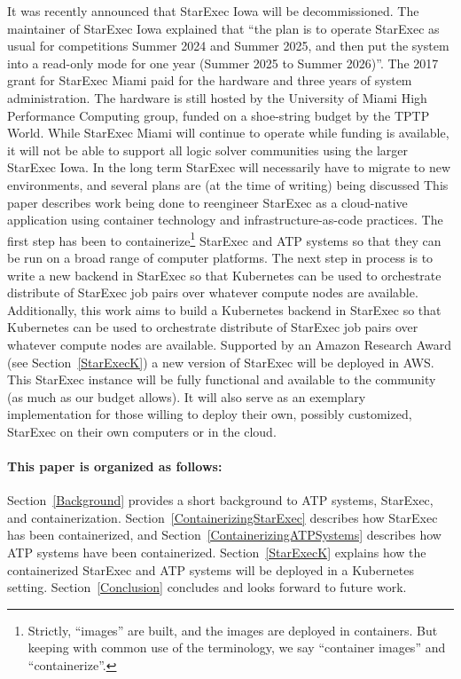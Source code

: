 \documentclass{easychair}
\begin{document}
It was recently announced that StarExec Iowa will be decommissioned. 
The maintainer of StarExec Iowa explained that ``the plan is to operate StarExec as usual for 
competitions Summer 2024 and Summer 2025, and then put the system into a read-only mode for one 
year (Summer 2025 to Summer 2026)''.
The 2017 grant for StarExec Miami paid for the hardware and three years of system administration.
The hardware is still hosted by the University of Miami High Performance Computing group,
funded on a shoe-string budget by the TPTP World.
While StarExec Miami will continue to operate while funding is available, it will not be able
to support all logic solver communities using the larger StarExec Iowa.
In the long term StarExec will necessarily have to migrate to new environments, and several plans 
are (at the time of writing) being discussed
This paper describes work being done to reengineer StarExec as a cloud-native application using
container technology and infrastructure-as-code practices.
The first step has been to containerize\footnote{%
Strictly, ``images'' are built, and the images are deployed in containers. 
But keeping with common use of the terminology, we say ``container images'' and ``containerize''.} 
StarExec and ATP systems so that they can be run on a broad range of computer platforms.
The next step in process is to write a new backend in StarExec so that Kubernetes can be used to
orchestrate distribute of StarExec job pairs over whatever compute nodes are available.
Additionally, this work aims to build a Kubernetes backend in StarExec so that Kubernetes can
be used to orchestrate distribute of StarExec job pairs over whatever compute nodes are available.
Supported by an Amazon Research Award (see Section~\ref{StarExecK}) a new version of StarExec
will be deployed in AWS.
This StarExec instance will be fully functional and available to the community (as much as our 
budget allows). 
It will also serve as an exemplary implementation for those willing to deploy their own, possibly 
customized, StarExec on their own computers or in the cloud.

\paragraph{This paper is organized as follows:}
Section~\ref{Background} provides a short background to ATP systems, StarExec, and 
containerization.
Section~\ref{ContainerizingStarExec} describes how StarExec has been containerized, and
Section~\ref{ContainerizingATPSystems} describes how ATP systems have been containerized.
Section~\ref{StarExecK} explains how the containerized StarExec and ATP systems will be deployed 
in a Kubernetes setting.
Section~\ref{Conclusion} concludes and looks forward to future work.
\end{document}
